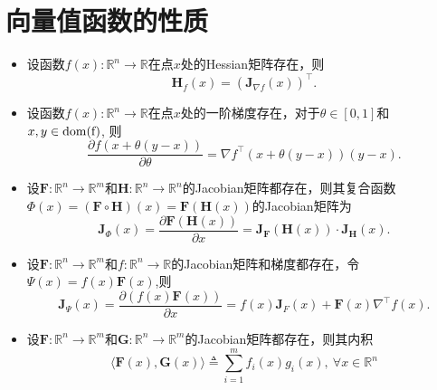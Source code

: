 \section{向量值函数的性质}
	\begin{itemize}
 \setlength{\itemsep}{0pt}
\setlength{\parsep}{0pt}
\setlength{\parskip}{0pt}
	\item[$(1)$] 	设函数$f(x): \mathbb{R}^n \to \mathbb{R}$在点$x$处的Hessian矩阵存在，则
	\begin{equation*}
		\mathbf{H}_f\left( x\right)  = \left( \mathbf{J}_{\nabla f}\left( x\right)  \right)^\top.
	\end{equation*}
	\item[$(2)$] 设函数$f(x): \mathbb{R}^n \to \mathbb{R}$在点$x$处的一阶梯度存在，对于$\theta \in [ 0,1]$和$x,y \in \rm{dom}(f)$, 则
	\begin{equation*}
		\dfrac{\partial f\left( x + \theta (y-x) \right) }{\partial \theta } = \nabla f^\top \left( x + \theta (y-x) \right) \left( y - x \right) .
	\end{equation*}
	\item[$(3)$] 设$\mathbf{F} : \mathbb{R}^{n} \rightarrow \mathbb{R}^{m}$和$\mathbf{H} : \mathbb{R}^{n} \rightarrow \mathbb{R}^{n}$的Jacobian矩阵都存在，则其复合函数
 $\Phi (x) = \left( \mathbf{F} \circ \mathbf{H} \right) (x) = \mathbf{F} \left( \mathbf{H} (x) \right)$的Jacobian矩阵为
	\begin{equation*}
		\mathbf{J}_{\Phi}\left( x \right) = \dfrac{\partial \mathbf{F} \left( \mathbf{H} \left( x \right) \right) }{\partial x} = \mathbf{J}_{\mathbf{F}}\left( \mathbf{H} \left( x \right) \right) \cdot \mathbf{J}_{\mathbf{H}}\left( x \right).
	\end{equation*}
 	\item[$(4)$] 设$\mathbf{F} : \mathbb{R}^{n} \rightarrow \mathbb{R}^{m}$和$f : \mathbb{R}^{n} \rightarrow \mathbb{R}$的Jacobian矩阵和梯度都存在，令$\Psi (x) = f(x) \mathbf{F}(x) $,则
	\begin{equation*}
		\mathbf{J}_{\Psi}\left( x \right) = \dfrac{\partial  \left( f(x) \mathbf{F}(x) \right) }{\partial x} = f(x) \mathbf{J}_{F}(x) + \mathbf{F}(x) \nabla^{\top} f(x)  .
	\end{equation*}
  	\item[$(5)$] 设$\mathbf{F} : \mathbb{R}^{n} \rightarrow \mathbb{R}^{m}$和$\mathbf{G}: \mathbb{R}^{n} \rightarrow \mathbb{R}^{m}$的Jacobian矩阵都存在，则其内积
   \begin{equation*}
       \langle \mathbf{F}(x), \mathbf{G}(x) \rangle \triangleq \sum_{i=1}^{m} f_{i}(x) g_{i}(x),~\forall x \in \mathbb{R}^{n}

\end{equation*}
\end{itemize}
